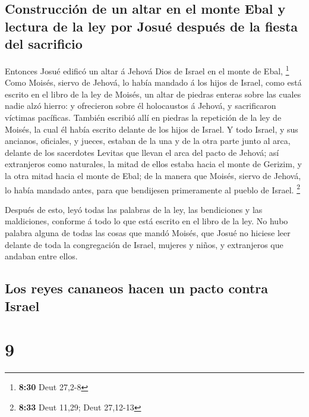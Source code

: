 \hypertarget{construcciuxf3n-de-un-altar-en-el-monte-ebal-y-lectura-de-la-ley-por-josuuxe9-despuuxe9s-de-la-fiesta-del-sacrificio}{%
\subsection{Construcción de un altar en el monte Ebal y lectura de la
ley por Josué después de la fiesta del
sacrificio}\label{construcciuxf3n-de-un-altar-en-el-monte-ebal-y-lectura-de-la-ley-por-josuuxe9-despuuxe9s-de-la-fiesta-del-sacrificio}}

 Entonces Josué edificó un altar á Jehová Dios de Israel en
el monte de Ebal, \footnote{\textbf{8:30} Deut 27,2-8} 
Como Moisés, siervo de Jehová, lo había mandado á los hijos de Israel,
como está escrito en el libro de la ley de Moisés, un altar de piedras
enteras sobre las cuales nadie alzó hierro: y ofrecieron sobre él
holocaustos á Jehová, y sacrificaron víctimas pacíficas. 
También escribió allí en piedras la repetición de la ley de Moisés, la
cual él había escrito delante de los hijos de Israel.  Y
todo Israel, y sus ancianos, oficiales, y jueces, estaban de la una y de
la otra parte junto al arca, delante de los sacerdotes Levitas que
llevan el arca del pacto de Jehová; así extranjeros como naturales, la
mitad de ellos estaba hacia el monte de Gerizim, y la otra mitad hacia
el monte de Ebal; de la manera que Moisés, siervo de Jehová, lo había
mandado antes, para que bendijesen primeramente al pueblo de Israel.
\footnote{\textbf{8:33} Deut 11,29; Deut 27,12-13}

 Después de esto, leyó todas las palabras de la ley, las
bendiciones y las maldiciones, conforme á todo lo que está escrito en el
libro de la ley.  No hubo palabra alguna de todas las cosas
que mandó Moisés, que Josué no hiciese leer delante de toda la
congregación de Israel, mujeres y niños, y extranjeros que andaban entre
ellos.

\hypertarget{los-reyes-cananeos-hacen-un-pacto-contra-israel}{%
\subsection{Los reyes cananeos hacen un pacto contra
Israel}\label{los-reyes-cananeos-hacen-un-pacto-contra-israel}}

\hypertarget{section-8}{%
\section{9}\label{section-8}}

